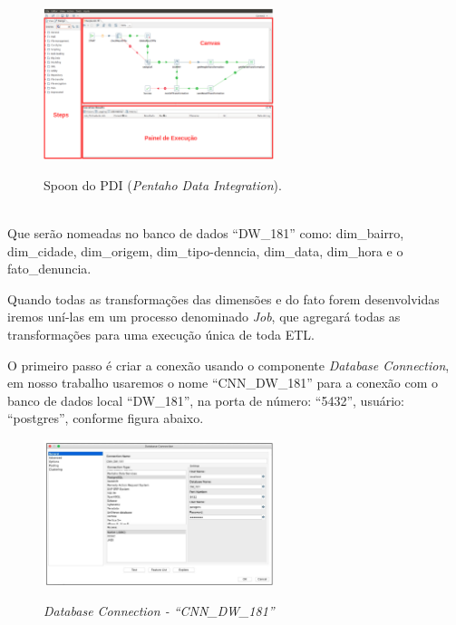 \begin{figure}[H]
	\vspace*{0,2cm}
    \centering
    \caption{Spoon do PDI (\textit{Pentaho Data Integration}).}
    \includegraphics[width=0.6\textwidth]{./04-figuras/figura-pentaho-pdi-spoon}
    \label{fig:ilustfigpentaho-pdi-spoon}
\end{figure}
\vspace*{-0,9cm}
{\raggedright {}} \\

Que ser\~{a}o nomeadas no banco de dados ``DW\_181'' como: dim\_bairro, dim\_cidade, dim\_origem, dim\_tipo-denncia, dim\_data, dim\_hora e o fato\_denuncia.

Quando todas as transforma\c{c}\~{o}es das dimens\~{o}es e do fato forem desenvolvidas iremos un\'{i}-las em um processo denominado \textit{Job}, que agregar\'{a} todas as transforma\c{c}\~{o}es para uma execu\c{c}\~{a}o única de toda ETL.

O primeiro passo \'{e} criar a conex\~{a}o usando o componente \textit{Database Connection}, em nosso trabalho usaremos o nome ``CNN\_DW\_181'' para a conex\~{a}o com o banco de dados local ``DW\_181'', na porta de número: ``5432'', usu\'{a}rio: ``postgres'', conforme figura abaixo.

\begin{figure}[H]
	\vspace*{0,2cm}
    \centering
    \caption{\textit{Database Connection - ``CNN\_DW\_181''}}
    \includegraphics[width=0.6\textwidth]{./04-figuras/figura-pentaho-database-connection}
    \label{fig:ilustfigpentaho-database-connection}
\end{figure}
\vspace*{-0,9cm}
{\raggedright {}} \\

